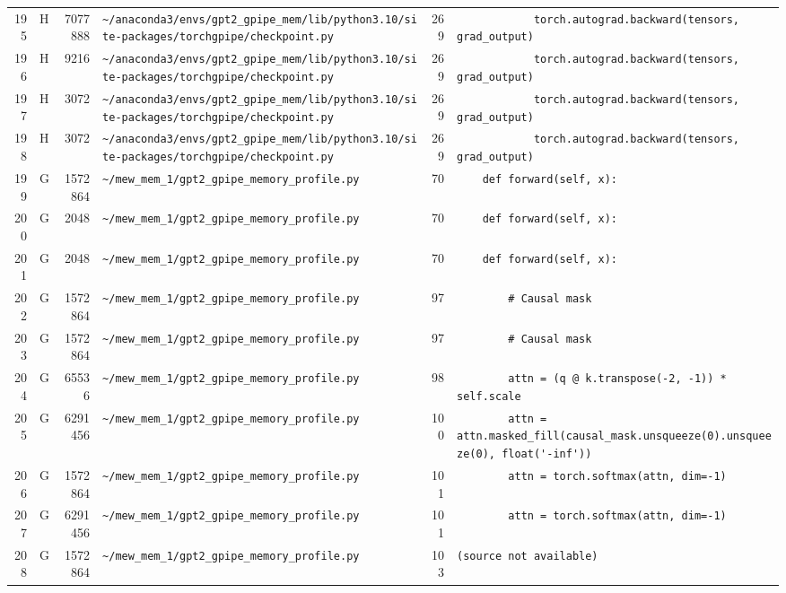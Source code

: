 \documentclass{article}
\begin{document}
\begin{longtable}{r l r p{6.5cm} r p{7.0cm}}
195 & H & 7077888 & \lstinline|~/anaconda3/envs/gpt2_gpipe_mem/lib/python3.10/site-packages/torchgpipe/checkpoint.py| & 269 & \lstinline|            torch.autograd.backward(tensors, grad_output)| \\
196 & H & 9216 & \lstinline|~/anaconda3/envs/gpt2_gpipe_mem/lib/python3.10/site-packages/torchgpipe/checkpoint.py| & 269 & \lstinline|            torch.autograd.backward(tensors, grad_output)| \\
197 & H & 3072 & \lstinline|~/anaconda3/envs/gpt2_gpipe_mem/lib/python3.10/site-packages/torchgpipe/checkpoint.py| & 269 & \lstinline|            torch.autograd.backward(tensors, grad_output)| \\
198 & H & 3072 & \lstinline|~/anaconda3/envs/gpt2_gpipe_mem/lib/python3.10/site-packages/torchgpipe/checkpoint.py| & 269 & \lstinline|            torch.autograd.backward(tensors, grad_output)| \\
199 & G & 1572864 & \lstinline|~/mew_mem_1/gpt2_gpipe_memory_profile.py| & 70 & \lstinline|    def forward(self, x):| \\
200 & G & 2048 & \lstinline|~/mew_mem_1/gpt2_gpipe_memory_profile.py| & 70 & \lstinline|    def forward(self, x):| \\
201 & G & 2048 & \lstinline|~/mew_mem_1/gpt2_gpipe_memory_profile.py| & 70 & \lstinline|    def forward(self, x):| \\
202 & G & 1572864 & \lstinline|~/mew_mem_1/gpt2_gpipe_memory_profile.py| & 97 & \lstinline|        # Causal mask| \\
203 & G & 1572864 & \lstinline|~/mew_mem_1/gpt2_gpipe_memory_profile.py| & 97 & \lstinline|        # Causal mask| \\
204 & G & 65536 & \lstinline|~/mew_mem_1/gpt2_gpipe_memory_profile.py| & 98 & \lstinline|        attn = (q @ k.transpose(-2, -1)) * self.scale| \\
205 & G & 6291456 & \lstinline|~/mew_mem_1/gpt2_gpipe_memory_profile.py| & 100 & \lstinline|        attn = attn.masked_fill(causal_mask.unsqueeze(0).unsqueeze(0), float('-inf'))| \\
206 & G & 1572864 & \lstinline|~/mew_mem_1/gpt2_gpipe_memory_profile.py| & 101 & \lstinline|        attn = torch.softmax(attn, dim=-1)| \\
207 & G & 6291456 & \lstinline|~/mew_mem_1/gpt2_gpipe_memory_profile.py| & 101 & \lstinline|        attn = torch.softmax(attn, dim=-1)| \\
208 & G & 1572864 & \lstinline|~/mew_mem_1/gpt2_gpipe_memory_profile.py| & 103 & \lstinline|(source not available)| \\

\end{longtable}
\end{document}
